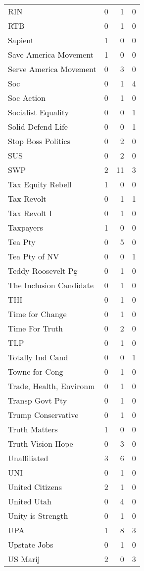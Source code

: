 \begin{supertabular}{lrrr}
RIN & 0 & 1 & 0\\
RTB & 0 & 1 & 0\\
Sapient & 1 & 0 & 0\\
Save America Movement & 1 & 0 & 0\\
Serve America Movement & 0 & 3 & 0\\
Soc & 0 & 1 & 4\\
Soc Action & 0 & 1 & 0\\
Socialist Equality & 0 & 0 & 1\\
Solid Defend Life & 0 & 0 & 1\\
Stop Boss Politics & 0 & 2 & 0\\
SUS & 0 & 2 & 0\\
SWP & 2 & 11 & 3\\
Tax Equity Rebell & 1 & 0 & 0\\
Tax Revolt & 0 & 1 & 1\\
Tax Revolt I & 0 & 1 & 0\\
Taxpayers & 1 & 0 & 0\\
Tea Pty & 0 & 5 & 0\\
Tea Pty of NV & 0 & 0 & 1\\
Teddy Roosevelt Pg & 0 & 1 & 0\\
The Inclusion Candidate & 0 & 1 & 0\\
THI & 0 & 1 & 0\\
Time for Change & 0 & 1 & 0\\
Time For Truth & 0 & 2 & 0\\
TLP & 0 & 1 & 0\\
Totally Ind Cand & 0 & 0 & 1\\
Towne for Cong & 0 & 1 & 0\\
Trade, Health, Environm & 0 & 1 & 0\\
Transp Govt Pty & 0 & 1 & 0\\
Trump Conservative & 0 & 1 & 0\\
Truth Matters & 1 & 0 & 0\\
Truth Vision Hope & 0 & 3 & 0\\
Unaffiliated & 3 & 6 & 0\\
UNI & 0 & 1 & 0\\
United Citizens & 2 & 1 & 0\\
United Utah & 0 & 4 & 0\\
Unity is Strength & 0 & 1 & 0\\
UPA & 1 & 8 & 3\\
Upstate Jobs & 0 & 1 & 0\\
US Marij & 2 & 0 & 3\\

\end{supertabular}
